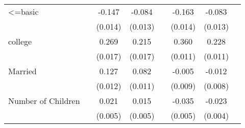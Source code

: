 \begin{longtable}{l*{3}{c}|l*{3}{c}}
	<=basic             &                     &      -0.147\sym{***}&      -0.084\sym{***}&                     &      -0.163\sym{***}&      -0.083\sym{***}\\
	&                     &     (0.014)         &     (0.013)         &                     &     (0.014)         &     (0.013)         \\
	college             &                     &       0.269\sym{***}&       0.215\sym{***}&                     &       0.360\sym{***}&       0.228\sym{***}\\
	&                     &     (0.017)         &     (0.017)         &                     &     (0.011)         &     (0.011)         \\
	Married             &                     &       0.127\sym{***}&       0.082\sym{***}&                     &      -0.005         &      -0.012         \\
	&                     &     (0.012)         &     (0.011)         &                     &     (0.009)         &     (0.008)         \\
	Number of Children  &                     &       0.021\sym{***}&       0.015\sym{***}&                     &      -0.035\sym{***}&      -0.023\sym{***}\\
	&                     &     (0.005)         &     (0.005)         &                     &     (0.005)         &     (0.004)         \\


\end{longtable}

